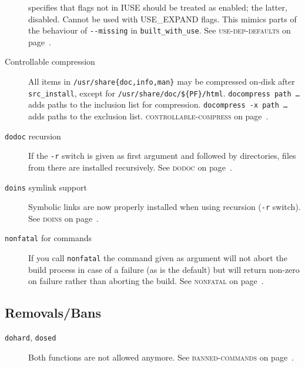 \documentclass[a4paper,notumble]{leaflet}
\newcommand{\code}[1]{\texttt{#1}}
\newcommand{\featureref}[1]{\textsc{#1} on page~\pageref{feat:#1}}
\begin{document}
\begin{description}
    specifies that flags not in IUSE should be treated as enabled; the
    latter, disabled. Cannot be used with USE\_EXPAND flags.  This
    mimics parts of the behaviour of \code{-{}-missing} in
    \code{built\_with\_use}.  See \featureref{use-dep-defaults}.
    \item[Controllable compression] All items in
    \code{/usr/share\{doc,info,man\}} may be compressed on-disk after
    \code{src\_install}, except for
    \code{/usr/share/doc/\$\{PF\}/html}.  \code{docompress path \dots}
    adds paths to the inclusion list for compression.
    \code{docompress -x path \dots} adds paths to the exclusion list.
    \featureref{controllable-compress}.
    \item[\code{dodoc} recursion] If the \code{-r} switch is given as
    first argument and followed by directories, files from there are
    installed recursively.  See \featureref{dodoc}.
    \item[\code{doins} symlink support] Symbolic links are now
    properly installed when using recursion (\code{-r} switch).  See
    \featureref{doins}.
    \item[\code{nonfatal} for commands] If you call \code{nonfatal}
    the command given as argument will not abort the build process in
    case of a failure (as is the default) but will return non-zero on
    failure rather than aborting the build.  See
    \featureref{nonfatal}.
\end{description}
\subsection{Removals/Bans}
\label{sec:cs:eapi4-removalsbans}
\begin{description}
    \item[\code{dohard}, \code{dosed}] Both functions are not allowed
    anymore.  See \featureref{banned-commands}.
\end{description}
\end{document}
